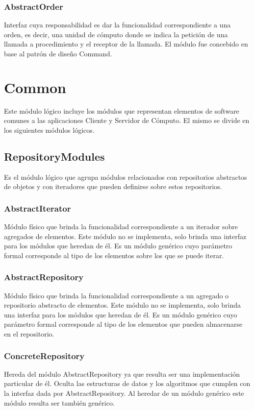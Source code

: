 \documentclass[a4paper,10pt]{report}
\begin{document}
		\subsection{AbstractOrder}		
		Interfaz cuya responsabilidad es dar la funcionalidad correspondiente a una orden, es decir, una unidad de cómputo donde se indica la petición de una llamada a procedimiento y el receptor de la llamada. El módulo fue concebido en base al patrón de diseño Command.















\chapter{Common}
Este módulo lógico incluye los módulos que representan elementos de software comunes a las aplicaciones Cliente y Servidor de Cómputo. El mismo se divide en los siguientes módulos lógicos.
	\section{RepositoryModules}
	Es el módulo lógico que agrupa módulos relacionados con repositorios abstractos de objetos y con iteradores que pueden definirse sobre estos repositorios.
		\subsection{AbstractIterator}
		Módulo físico que brinda la funcionalidad correspondiente a un iterador sobre agregados de elementos. Este módulo no se implementa, solo brinda una interfaz para los módulos que heredan de él. Es un módulo genérico cuyo parámetro formal corresponde al tipo de los elementos sobre los que se puede iterar.
		\subsection{AbstractRepository}
		Módulo físico que brinda la funcionalidad correspondiente a un agregado o repositorio abstracto de elementos. Este módulo no se implementa, solo brinda una interfaz para los módulos que heredan de él. Es un módulo genérico cuyo parámetro formal corresponde al tipo de los elementos que pueden almacenarse en el repositorio.
		\subsection{ConcreteRepository}
		Hereda del módulo AbstractRepository ya que resulta ser una implementación particular de él. Oculta las estructuras de datos y los algoritmos que cumplen con la interfaz dada por AbstractRepository. Al heredar de un módulo genérico este módulo resulta ser también genérico.
\end{document}
